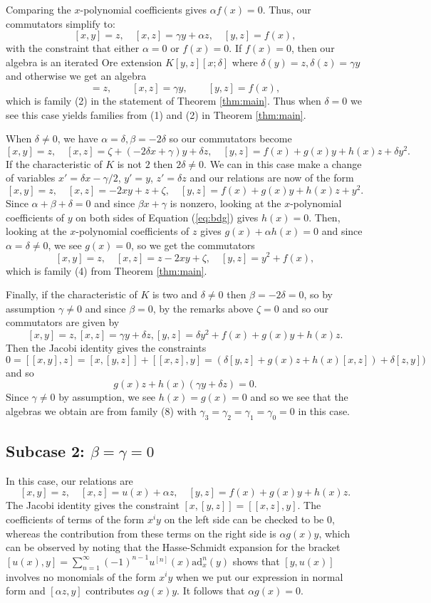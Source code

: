 \documentclass[a4paper,11pt,twoside,notitlepage,reqno]{amsart}
\theoremstyle{plain}
\numberwithin{thm}{section}
\theoremstyle{definition}
\begin{document}
Comparing the $x$-polynomial coefficients gives $\alpha f(x) = 0$. Thus, our commutators simplify to:
$$[x,y] = z, \quad [x,z] = \gamma y + \alpha z, \quad [y,z] = f(x),$$
with the constraint that either $\alpha = 0$ or $f(x) = 0$.
If $f(x)=0$, then our algebra is an iterated Ore extension $K[y,z][x;\delta]$ where $\delta(y)=z, \delta(z)=\gamma y$ and otherwise we get an algebra
\begin{equation}
[x,y]=z, \qquad [x,z]=\gamma y, \qquad [y,z]=f(x),
\end{equation}
which is family (2) in the statement of Theorem \ref{thm:main}.  Thus when $\delta=0$ we see this case yields families from (1) and (2) in Theorem \ref{thm:main}.

When $\delta\neq 0$, we have $\alpha=\delta, \beta=-2\delta$ so our commutators become
$$[x,y]=z, \quad [x,z] = \zeta + (-2\delta x+\gamma) y + \delta z, \quad [y,z] = f(x) + g(x) y+h(x)z+\delta y^2.$$
If the characteristic of $K$ is not $2$ then $2\delta\neq 0$.  We can in this case make a change of variables
$x'=\delta x-\gamma/2$, $y' = y$, $z'=\delta z$ and our relations are now of the form
$$[x,y]=z, \quad [x,z] = -2xy + z+\zeta, \quad [y,z] = f(x) + g(x) y+h(x)z+y^2.$$
Since $\alpha+\beta+\delta=0$ and since $\beta x+ \gamma$ is nonzero, looking at the $x$-polynomial coefficients of $y$ on both sides of Equation (\ref{eq:bdg}) gives
$h(x)=0$.  Then, looking at the $x$-polynomial coefficients of $z$ gives $g(x)+\alpha h(x)=0$ and since $\alpha=\delta\neq 0$, we see $g(x)=0$, so we get 
the commutators
$$[x,y]=z,\quad [x,z] =z-2xy +\zeta, \quad [y,z]=y^2+f(x),$$ which is family (4) from Theorem \ref{thm:main}.

Finally, if the characteristic of $K$ is two and $\delta\neq 0$ then $\beta=-2\delta=0$, so by assumption $\gamma\neq 0$ and since $\beta=0$, by the remarks above $\zeta=0$ and so our commutators are given by 
$$[x,y]=z, [x,z] = \gamma y + \delta z, [y,z] = \delta y^2 + f(x) + g(x) y + h(x) z.$$
Then the Jacobi identity gives the constraints
$$0=[[x,y],z]=[x,[y,z]]+[[x,z],y] = (\delta [y,z] + g(x) z + h(x) [x,z])+\delta [z,y])$$ and so
$$g(x)z + h(x) (\gamma y + \delta z)=0.$$ Since $\gamma\neq 0$ by assumption, we see $h(x)=g(x)=0$ and so we see that the algebras we obtain are from family (8) with $\gamma_3=\gamma_2=\gamma_1=\gamma_0 =0$ in this case.


\subsection{Subcase 2: $\beta=\gamma=0$}
In this case, our relations are
$$[x,y]=z, \quad [x,z] =  u(x) +  \alpha z, \quad [y,z] = f(x) + g(x) y+h(x)z.$$
The Jacobi identity gives the constraint
$[x,[y,z]]=[[x,z],y]$.  The coefficients of terms of the form $x^iy$ on the left side can be checked to be $0$, whereas the contribution from these terms on the right side is
$\alpha g(x)y$, which can be observed by noting that 
the Hasse-Schmidt expansion for the bracket $[u(x), y] = \sum_{n=1}^{\infty} (-1)^{n-1} u^{[n]}(x) \text{ad}_x^n(y)$ shows that $[y,u(x)]$ involves no monomials of the form $x^iy$ when we put our expression in normal form and $[\alpha z,y]$ contributes $\alpha g(x)y$.  It follows that $\alpha g(x)=0$.
\end{document}
